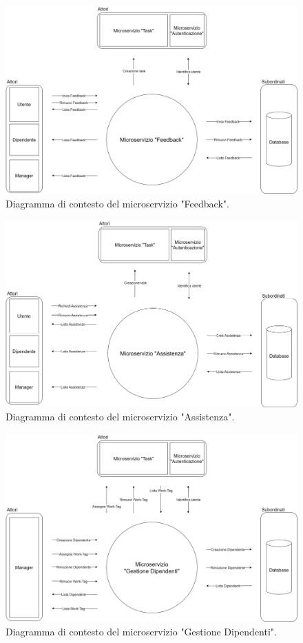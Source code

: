 \documentclass{report}
\begin{document}
\begin{figure}[H]
	\centering\includegraphics[width=1\textwidth]{images/Diagrammi_Contesto/Diagramma_Contesto_Feedback.png}
	Diagramma di contesto del microservizio "Feedback".
\end{figure}

\begin{figure}[H]
	\centering\includegraphics[width=1\textwidth]{images/Diagrammi_Contesto/Diagramma_Contesto_Assistenza.png}
	Diagramma di contesto del microservizio "Assistenza".
\end{figure}

\begin{figure}[H]
	\centering\includegraphics[width=1\textwidth]{images/Diagrammi_Contesto/Diagramma_Contesto_Dipendenti.png}
	Diagramma di contesto del microservizio "Gestione Dipendenti".
\end{figure}
\end{document}
